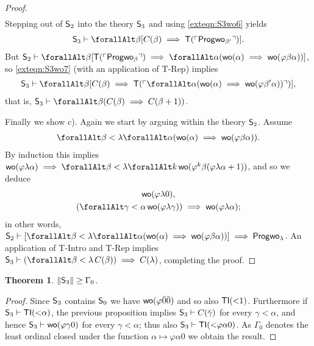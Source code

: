 \documentclass[UKenglish,cleveref,DIV=12]{scrartcl}
\let\forall\forallAlt
\newtheorem{theorem}{Theorem}
\newtheorem{corollary}[lemma]{Corollary}
\theoremstyle{definition}
\theoremstyle{definition}
\begin{document}
\begin{proof}
\begin{align}
\end{align}
Stepping out of $\mathsf{S}_2$ into the theory $\mathsf{S}_3$ and using \cref{exteqn:S3wo6} yields
\begin{align}\label{exteqn:S3wo7}
 \theory S_3\proves \forall\beta[C(\beta)\implies \T(\gn{\Prog\wo_{\beta'}})].
\end{align}
But $\theory S_2\proves\forall\beta[ \T(\gn{\Prog\wo_{\beta}})\implies\forall\alpha(\wo(\alpha)\implies \wo(\varphi\beta\alpha))]$, so \cref{exteqn:S3wo7} (with an application of T-Rep) implies
\begin{align*}
 \theory S_3\proves \forall\beta[C(\beta)\implies \T(\gn{\forall\alpha(\wo(\alpha)\implies \wo(\varphi\beta'\alpha))})],
\end{align*}
that is, $\theory S_3\proves \forall\beta(C(\beta)\implies C(\beta+1))$.

Finally we show c). Again we start by arguing within the theory $\mathsf{S}_2$. Assume
\begin{align}\label{exteqn:S3wo8}
 \forall\beta<\lambda\forall\alpha(\wo(\alpha)\implies\wo(\varphi\beta\alpha)).
\end{align}
By induction this implies
$\wo(\varphi\lambda\alpha)\implies\forall\beta<\lambda\forall
k\,\wo(\varphi^k\beta(\varphi\lambda\alpha+1))$, and so we deduce
\begin{gather*}
 \wo(\varphi\lambda0), \label{exteqn:S3wo9}\\
 (\forall\gamma<\alpha\,\wo(\varphi\lambda\gamma))\implies \wo(\varphi\lambda\alpha);\label{exteqn:S3wo10}
\end{gather*}
in other words,
 $\theory S_2\proves[\forall\beta<\lambda\forall \alpha(\wo(\alpha)\implies\wo(\varphi\beta\alpha))]\implies \Prog\wo_{\lambda}$.
An application of T-Intro and T-Rep implies $\theory S_3\proves
(\forall\beta<\lambda\,C(\beta))\implies C(\lambda)$, completing the proof.
\end{proof}
\begin{theorem}\label{extthm:S3lowerbd}
 $\lVert{\mathsf{S}_3}\rVert\ge\Gamma_0$.
\end{theorem}
\begin{proof}%
Since $\mathsf{S}_3$ contains $\mathsf{S}_0$ we have $\mathsf{wo}(\varphi\bar0\bar0)$ and
so also $\mathsf{TI}(\mathord<1)$. Furthermore if $\mathsf{S}_3\vdash\mathsf{TI}(\mathord<\alpha)$, the previous proposition implies $\mathsf{S}_3\vdash C(\bar\gamma)$ for every $\gamma<\alpha$, and hence $\mathsf{S}_3\vdash\mathsf{wo}(\varphi\gamma0)$ for every $\gamma<\alpha$; thus also $\mathsf{S}_3\vdash\mathsf{TI}(\mathord<\varphi\alpha0)$. As $\Gamma_0$ denotes the least
ordinal closed under the function $\alpha\mapsto\varphi\alpha0$ we obtain the
result.
\end{proof}
\end{document}

